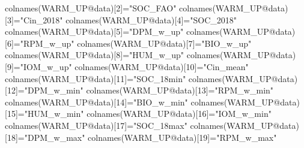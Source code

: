 \documentclass[
  10pt,
  b5paper,
]{book}
\newenvironment{Shaded}{\begin{snugshade}}{\end{snugshade}}
\newcommand{\DecValTok}[1]{\textcolor[rgb]{0.00,0.00,0.81}{#1}}
\newcommand{\FunctionTok}[1]{\textcolor[rgb]{0.00,0.00,0.00}{#1}}
\newcommand{\NormalTok}[1]{#1}
\newcommand{\OtherTok}[1]{\textcolor[rgb]{0.56,0.35,0.01}{#1}}
\newcommand{\SpecialCharTok}[1]{\textcolor[rgb]{0.00,0.00,0.00}{#1}}
\newcommand{\StringTok}[1]{\textcolor[rgb]{0.31,0.60,0.02}{#1}}
\begin{document}
\begin{Shaded}
\begin{Highlighting}[]
\FunctionTok{colnames}\NormalTok{(WARM\_UP}\SpecialCharTok{@}\NormalTok{data)[}\DecValTok{2}\NormalTok{]}\OtherTok{=}\StringTok{"SOC\_FAO"}
\FunctionTok{colnames}\NormalTok{(WARM\_UP}\SpecialCharTok{@}\NormalTok{data)[}\DecValTok{3}\NormalTok{]}\OtherTok{=}\StringTok{"Cin\_2018"}
\FunctionTok{colnames}\NormalTok{(WARM\_UP}\SpecialCharTok{@}\NormalTok{data)[}\DecValTok{4}\NormalTok{]}\OtherTok{=}\StringTok{"SOC\_2018"}
\FunctionTok{colnames}\NormalTok{(WARM\_UP}\SpecialCharTok{@}\NormalTok{data)[}\DecValTok{5}\NormalTok{]}\OtherTok{=}\StringTok{"DPM\_w\_up"}
\FunctionTok{colnames}\NormalTok{(WARM\_UP}\SpecialCharTok{@}\NormalTok{data)[}\DecValTok{6}\NormalTok{]}\OtherTok{=}\StringTok{"RPM\_w\_up"}
\FunctionTok{colnames}\NormalTok{(WARM\_UP}\SpecialCharTok{@}\NormalTok{data)[}\DecValTok{7}\NormalTok{]}\OtherTok{=}\StringTok{"BIO\_w\_up"}
\FunctionTok{colnames}\NormalTok{(WARM\_UP}\SpecialCharTok{@}\NormalTok{data)[}\DecValTok{8}\NormalTok{]}\OtherTok{=}\StringTok{"HUM\_w\_up"}
\FunctionTok{colnames}\NormalTok{(WARM\_UP}\SpecialCharTok{@}\NormalTok{data)[}\DecValTok{9}\NormalTok{]}\OtherTok{=}\StringTok{"IOM\_w\_up"}
\FunctionTok{colnames}\NormalTok{(WARM\_UP}\SpecialCharTok{@}\NormalTok{data)[}\DecValTok{10}\NormalTok{]}\OtherTok{=}\StringTok{"Cin\_mean"}
\FunctionTok{colnames}\NormalTok{(WARM\_UP}\SpecialCharTok{@}\NormalTok{data)[}\DecValTok{11}\NormalTok{]}\OtherTok{=}\StringTok{"SOC\_18min"}
\FunctionTok{colnames}\NormalTok{(WARM\_UP}\SpecialCharTok{@}\NormalTok{data)[}\DecValTok{12}\NormalTok{]}\OtherTok{=}\StringTok{"DPM\_w\_min"}
\FunctionTok{colnames}\NormalTok{(WARM\_UP}\SpecialCharTok{@}\NormalTok{data)[}\DecValTok{13}\NormalTok{]}\OtherTok{=}\StringTok{"RPM\_w\_min"}
\FunctionTok{colnames}\NormalTok{(WARM\_UP}\SpecialCharTok{@}\NormalTok{data)[}\DecValTok{14}\NormalTok{]}\OtherTok{=}\StringTok{"BIO\_w\_min"}
\FunctionTok{colnames}\NormalTok{(WARM\_UP}\SpecialCharTok{@}\NormalTok{data)[}\DecValTok{15}\NormalTok{]}\OtherTok{=}\StringTok{"HUM\_w\_min"}
\FunctionTok{colnames}\NormalTok{(WARM\_UP}\SpecialCharTok{@}\NormalTok{data)[}\DecValTok{16}\NormalTok{]}\OtherTok{=}\StringTok{"IOM\_w\_min"}
\FunctionTok{colnames}\NormalTok{(WARM\_UP}\SpecialCharTok{@}\NormalTok{data)[}\DecValTok{17}\NormalTok{]}\OtherTok{=}\StringTok{"SOC\_18max"}
\FunctionTok{colnames}\NormalTok{(WARM\_UP}\SpecialCharTok{@}\NormalTok{data)[}\DecValTok{18}\NormalTok{]}\OtherTok{=}\StringTok{"DPM\_w\_max"}
\FunctionTok{colnames}\NormalTok{(WARM\_UP}\SpecialCharTok{@}\NormalTok{data)[}\DecValTok{19}\NormalTok{]}\OtherTok{=}\StringTok{"RPM\_w\_max"}

\end{Highlighting}
\end{Shaded}
\end{document}

